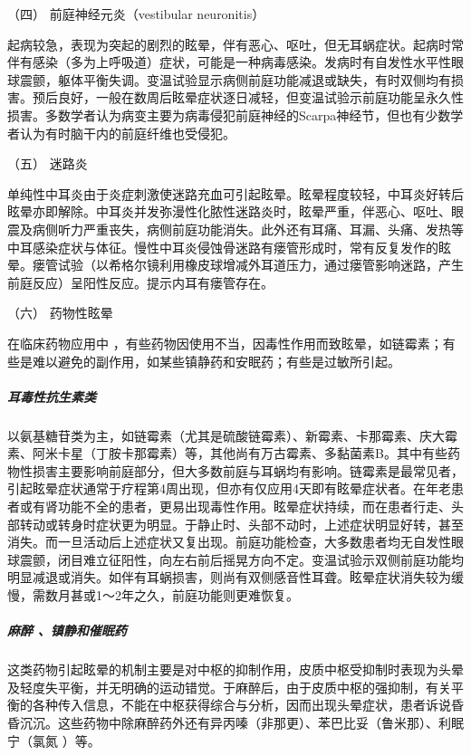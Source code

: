 \hypertarget{text00012.htmlux5cux23CHP1-3-2-6-4}{}
（四） 前庭神经元炎（vestibular neuronitis）

起病较急，表现为突起的剧烈的眩晕，伴有恶心、呕吐，但无耳蜗症状。起病时常伴有感染（多为上呼吸道）症状，可能是一种病毒感染。发病时有自发性水平性眼球震颤，躯体平衡失调。变温试验显示病侧前庭功能减退或缺失，有时双侧均有损害。预后良好，一般在数周后眩晕症状逐日减轻，但变温试验示前庭功能呈永久性损害。多数学者认为病变主要为病毒侵犯前庭神经的Scarpa神经节，但也有少数学者认为有时脑干内的前庭纤维也受侵犯。

\hypertarget{text00012.htmlux5cux23CHP1-3-2-6-5}{}
（五） 迷路炎

单纯性中耳炎由于炎症刺激使迷路充血可引起眩晕。眩晕程度较轻，中耳炎好转后眩晕亦即解除。中耳炎并发弥漫性化脓性迷路炎时，眩晕严重，伴恶心、呕吐、眼震及病侧听力严重丧失，病侧前庭功能消失。此外还有耳痛、耳漏、头痛、发热等中耳感染症状与体征。慢性中耳炎侵蚀骨迷路有瘘管形成时，常有反复发作的眩晕。瘘管试验（以希格尔镜利用橡皮球增减外耳道压力，通过瘘管影响迷路，产生前庭反应）呈阳性反应。提示内耳有瘘管存在。

\hypertarget{text00012.htmlux5cux23CHP1-3-2-6-6}{}
（六） 药物性眩晕

在临床药物应用中
，有些药物因使用不当，因毒性作用而致眩晕，如链霉素；有些是难以避免的副作用，如某些镇静药和安眠药；有些是过敏所引起。

\subparagraph{耳毒性抗生素类}

以氨基糖苷类为主，如链霉素（尤其是硫酸链霉素）、新霉素、卡那霉素、庆大霉素、阿米卡星（丁胺卡那霉素）等，其他尚有万古霉素、多黏菌素B。其中有些药物性损害主要影响前庭部分，但大多数前庭与耳蜗均有影响。链霉素是最常见者，引起眩晕症状通常于疗程第4周出现，但亦有仅应用4天即有眩晕症状者。在年老患者或有肾功能不全的患者，更易出现毒性作用。眩晕症状持续，而在患者行走、头部转动或转身时症状更为明显。于静止时、头部不动时，上述症状明显好转，甚至消失。而一旦活动后上述症状又复出现。前庭功能检查，大多数患者均无自发性眼球震颤，闭目难立征阳性，向左右前后摇晃方向不定。变温试验示双侧前庭功能均明显减退或消失。如伴有耳蜗损害，则尚有双侧感音性耳聋。眩晕症状消失较为缓慢，需数月甚或1～2年之久，前庭功能则更难恢复。

\subparagraph{麻醉 、镇静和催眠药}

这类药物引起眩晕的机制主要是对中枢的抑制作用，皮质中枢受抑制时表现为头晕及轻度失平衡，并无明确的运动错觉。于麻醉后，由于皮质中枢的强抑制，有关平衡的各种传入信息，不能在中枢获得综合与分析，因而出现头晕症状，患者诉说昏昏沉沉。这些药物中除麻醉药外还有异丙嗪（非那更）、苯巴比妥（鲁米那）、利眠宁（氯氮{}
）等。

